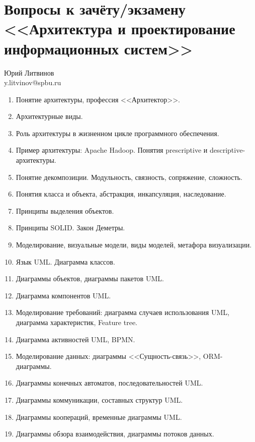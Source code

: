 \documentclass[a5paper]{article}
\begin{document}
\thispagestyle{empty}

\section*{Вопросы к зачёту/экзамену <<Архитектура и проектирование информационных систем>>}

\begin{flushright}\begin{small}Юрий Литвинов\\\small{y.litvinov@spbu.ru}\end{small}\end{flushright}

\begin{enumerate}
    \item Понятие архитектуры, профессия <<Архитектор>>.
    \item Архитектурные виды.
    \item Роль архитектуры в жизненном цикле программного обеспечения.
    \item Пример архитектуры: Apache Hadoop. Понятия prescriptive и descriptive-архитектуры.
    \item Понятие декомпозиции. Модульность, связность, сопряжение, сложность.
    \item Понятия класса и объекта, абстракция, инкапсуляция, наследование. 
    \item Принципы выделения объектов.
    \item Принципы SOLID. Закон Деметры.
    \item Моделирование, визуальные модели, виды моделей, метафора визуализации.
    \item Язык UML. Диаграмма классов.
    \item Диаграммы объектов, диаграммы пакетов UML.
    \item Диаграмма компонентов UML.
    \item Моделирование требований: диаграмма случаев использования UML, диаграмма характеристик, Feature tree.
    \item Диаграмма активностей UML, BPMN.
    \item Моделирование данных: диаграммы <<Сущность-связь>>, ORM-диаграммы.
    \item Диаграммы конечных автоматов, последовательностей UML.
    \item Диаграммы коммуникации, составных структур UML.
    \item Диаграммы коопераций, временные диаграммы UML.
    \item Диаграммы обзора взаимодействия, диаграммы потоков данных.

\end{enumerate}
\end{document}
